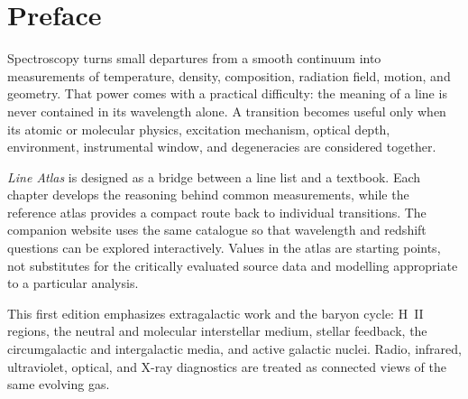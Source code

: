 \chapter*{Preface}

Spectroscopy turns small departures from a smooth continuum into measurements
of temperature, density, composition, radiation field, motion, and geometry.
That power comes with a practical difficulty: the meaning of a line is never
contained in its wavelength alone. A transition becomes useful only when its
atomic or molecular physics, excitation mechanism, optical depth, environment,
instrumental window, and degeneracies are considered together.

\emph{Line Atlas} is designed as a bridge between a line list and a textbook.
Each chapter develops the reasoning behind common measurements, while the
reference atlas provides a compact route back to individual transitions. The
companion website uses the same catalogue so that wavelength and redshift
questions can be explored interactively. Values in the atlas are starting
points, not substitutes for the critically evaluated source data and modelling
appropriate to a particular analysis.

This first edition emphasizes extragalactic work and the baryon cycle: H~II
regions, the neutral and molecular interstellar medium, stellar feedback, the
circumgalactic and intergalactic media, and active galactic nuclei. Radio,
infrared, ultraviolet, optical, and X-ray diagnostics are treated as connected
views of the same evolving gas.
